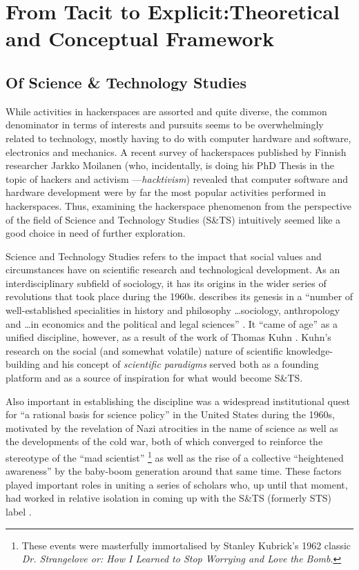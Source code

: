 \section{From Tacit to Explicit:\newline{}Theoretical and Conceptual Framework}

\subsection{Of Science \& Technology Studies}

While activities in hackerspaces are assorted and quite diverse, the common denominator in terms of interests and pursuits seems to be overwhelmingly related to technology, mostly having to do with computer hardware and software, electronics and mechanics. A recent survey of hackerspaces published by Finnish researcher Jarkko Moilanen \citeyearpar{moilanen10} (who, incidentally, is doing his PhD Thesis in the topic of hackers and activism ---\textit{hacktivism}) revealed that computer software and hardware development were by far the most popular activities performed in hackerspaces. Thus, examining the hackerspace phenomenon from the perspective of the field of Science and Technology Studies (S\&TS) intuitively seemed like a good choice in need of further exploration.

Science and Technology Studies refers to the impact that social values and circumstances have on scientific research and technological development. As an interdisciplinary subfield of sociology, it has its origins in the wider series of revolutions that took place during the 1960s. \citet{edge95} describes its genesis in a ``number of well-established specialities in history and philosophy \ldots sociology, anthropology and \ldots in economics and the political and legal sciences'' \citep[p.4]{edge95}. It ``came of age'' as a unified discipline, however, as a result of the work of Thomas Kuhn \citeyearpar{kuhn62}. Kuhn's research on the social (and somewhat volatile) nature of scientific knowledge-building and his concept of \textit{scientific paradigms} served both as a founding platform and as a source of inspiration for what would become S\&TS. 

Also important in establishing the discipline was a widespread institutional quest for ``a rational basis for science policy'' \citep{edge95} in the United States during the 1960s, motivated by the revelation of Nazi atrocities in the name of science as well as the developments of the cold war, both of which converged to reinforce the stereotype of the ``mad scientist'' \citep{frayling05}\footnote{These events were masterfully immortalised by Stanley Kubrick's 1962 classic \textit{Dr. Strangelove or: How I Learned to Stop Worrying and Love the Bomb}.} as well as the rise of a collective ``heightened awareness'' by the baby-boom generation around that same time. These factors played important roles in uniting a series of scholars who, up until that moment, had worked in relative isolation in coming up with the S\&TS (formerly STS) label \citep{kaplan91}.

